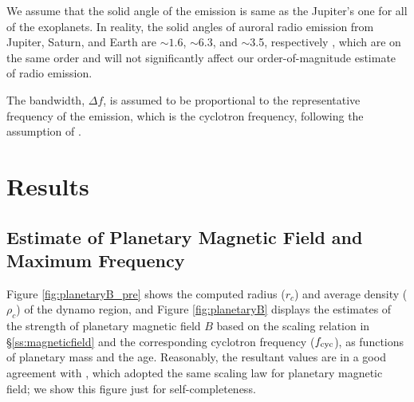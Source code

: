 \documentclass{emulateapj}
\def\memoDS#1{\color{blue}$[${\bf #1}$]$ \color{black}}
\begin{document}

We assume that the solid angle of the emission is same as the Jupiter's one for all of the exoplanets. In reality, the solid angles of auroral radio emission from  Jupiter, Saturn, and Earth are $\sim 1.6$, $\sim $6.3, and $\sim $3.5, respectively \citep{desch+kaiser1984}, which are on the same order and will not significantly affect our order-of-magnitude estimate of radio emission. 

The bandwidth, $\Delta f$, is assumed to be proportional to the representative frequency of the emission, which is the cyclotron frequency, following the assumption of \citet{griesmeier2007b}.



\section{Results}
\label{s:result}

\subsection{Estimate of Planetary Magnetic Field and Maximum Frequency}
\label{ss:Bplanet}

Figure \ref{fig:planetaryB_pre} shows the computed radius ($r_c$) and average density ($\rho_c$) of the dynamo region, and Figure \ref{fig:planetaryB} displays the estimates of the strength of planetary magnetic field $B$ based on the scaling relation in \S\ref{ss:magneticfield} and the corresponding cyclotron frequency ($f_{\rm cyc}$), as functions of planetary mass and the age. 
Reasonably, the resultant values are in a good agreement with \citet{reiners2010}, which adopted the same scaling law for planetary magnetic field; we show this figure just for self-completeness. 
\end{document}
